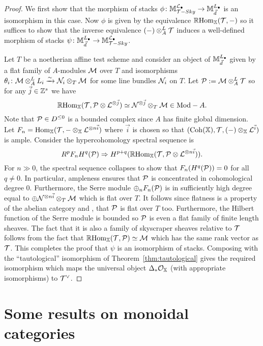 \documentclass[12pt]{amsart}
\begin{document}
\begin{proof}
We first show that the morphism of stacks $\phi \colon \mathbb{M}_{\mathcal{T}-Sky}^{\mathcal{L}_{\bullet}} \to \mathbb{M}_{\vec{d}}^{L_{\bullet}}$ is an isomorphism in this case. Now $\phi$ is given by the equivalence $\mathop{\mathbb{R}\mathrm{Hom}}\nolimits_{\mathbb{X}}(\mathcal{T}, -)$ so it suffices to show that the inverse equivalence $(-) \otimes^L_A \mathcal{T}$ induces a well-defined morphism of stacks $\psi \colon \mathbb{M}_{\vec{d}}^{L_{\bullet}} \to \mathbb{M}_{\mathcal{T}-Sky}^{\mathcal{L}_{\bullet}}$. 

Let $T$ be a noetherian affine test scheme and consider an object of $\mathbb{M}_{\vec{d}}^{L_{\bullet}}$ given by a flat family of $A$-modules $\mathcal{M}$ over $T$ and isomorphisms $\theta_i \colon \mathcal{M} \otimes_A^L L_i \xrightarrow{\sim} \mathcal{N}_i \otimes_T \mathcal{M}$ for some line bundles $\mathcal{N}_i$ on $T$. Let $\mathcal{P} := \mathcal{M} \otimes_A^L \mathcal{T}$ so for any $\vec{j} \in \mathbb{Z}^s$ we have
$$\mathop{\mathbb{R}\mathrm{Hom}}\nolimits_{\mathbb{X}}(\mathcal{T}, \mathcal{P} \otimes \mathcal{L}^{\otimes \vec{j}}) \simeq \mathcal{N}^{\otimes \vec{j}} \otimes_T \mathcal{M} \in \textup{Mod}-A.$$
Note that $\mathcal{P} \in D^{\leq 0}$ is a bounded complex since $A$ has finite global dimension. Let $F_n = \operatorname{Hom}_{\mathbb{X}}(\mathcal{T}, - \otimes_{\mathbb{X}} \mathcal{L}^{\otimes n \vec{i}})$ where $\vec{i}$ is chosen so that $(\operatorname{Coh}(\mathbb{X}), \mathcal{T}, (-)\otimes_{\mathbb{X}} \mathcal{L}^{\vec{i}})$ is ample. Consider the hypercohomology spectral sequence is 
$$ R^pF_n H^q(\mathcal{P}) \Rightarrow H^{p+q}(\mathop{\mathbb{R}\mathrm{Hom}}\nolimits_{\mathbb{X}}(\mathcal{T}, \mathcal{P} \otimes \mathcal{L}^{\otimes n\vec{i}})).$$
For $n\gg 0$, the spectral sequence collapses to show that $F_n(H^q(\mathcal{P})) = 0$ for all $q \neq 0$. In particular, ampleness ensures that $\mathcal{P}$ is concentrated in cohomological degree 0. Furthermore, the Serre module $\oplus_n F_n(\mathcal{P})$ is in sufficiently high degree equal to 
$\oplus \mathcal{N}^{\otimes n \vec{i}} \otimes_T \mathcal{M}$ which is flat over $T$. It follows since flatness is a property of the abelian category and \cite{AZ94}, that $\mathcal{P}$ is flat over $T$ too. Furthermore, the Hilbert function of the Serre module is bounded so $\mathcal{P}$ is even a flat family of finite length sheaves. The fact that it is also a family of skyscraper sheaves relative to $\mathcal{T}$ follows from the fact that $\mathop{\mathbb{R}\mathrm{Hom}}\nolimits_{\mathbb{X}}(\mathcal{T}, \mathcal{P}) \simeq \mathcal{M}$ which has the same rank vector as $\mathcal{T}$. This completes the proof that $\psi$ is an isomorphism of stacks. Composing with the ``tautological'' isomorphism of Theorem~\ref{thm:tautological} gives the required isomorphism which maps the universal object $\Delta_{*}\mathcal{O}_{\mathbb{X}}$ (with appropriate isomorphisms) to $\mathcal{T}^{\vee}$. 
\end{proof}


\section{Some results on monoidal categories}
\label{sec:monoidal}
\end{document}

